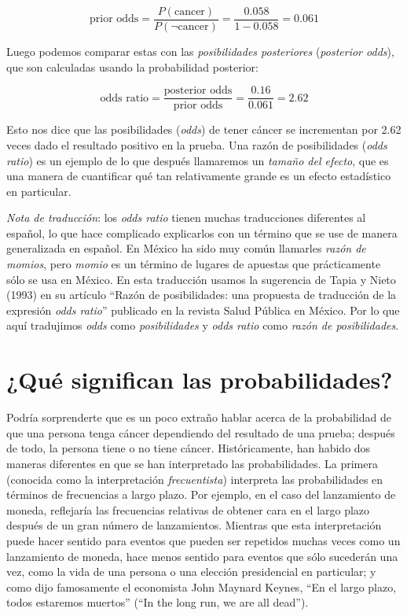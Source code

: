 \documentclass[
  12pt,
]{book}
\begin{document}
\[
\text{prior odds} = \frac{P(\text{cancer})}{P(\neg \text{cancer})} =\frac{0.058}{1 - 0.058} = 0.061
\]

Luego podemos comparar estas con las \emph{posibilidades posteriores} (\emph{posterior odds}), que son calculadas usando la probabilidad posterior:

\[
\text{odds ratio} = \frac{\text{posterior odds}}{\text{prior odds}} = \frac{0.16}{0.061} = 2.62
\]

Esto nos dice que las posibilidades (\emph{odds}) de tener cáncer se incrementan por 2.62 veces dado el resultado positivo en la prueba. Una razón de posibilidades (\emph{odds ratio}) es un ejemplo de lo que después llamaremos un \emph{tamaño del efecto}, que es una manera de cuantificar qué tan relativamente grande es un efecto estadístico en particular.

\emph{Nota de traducción}: los \emph{odds ratio} tienen muchas traducciones diferentes al español, lo que hace complicado explicarlos con un término que se use de manera generalizada en español. En México ha sido muy común llamarles \emph{razón de momios}, pero \emph{momio} es un término de lugares de apuestas que prácticamente sólo se usa en México. En esta traducción usamos la sugerencia de Tapia y Nieto (1993) en su artículo ``Razón de posibilidades: una propuesta de traducción de la expresión \emph{odds ratio}'' publicado en la revista Salud Pública en México. Por lo que aquí tradujimos \emph{odds} como \emph{posibilidades} y \emph{odds ratio} como \emph{razón de posibilidades}.

\hypertarget{quuxe9-significan-las-probabilidades}{%
\section{¿Qué significan las probabilidades?}\label{quuxe9-significan-las-probabilidades}}

Podría sorprenderte que es un poco extraño hablar acerca de la probabilidad de que una persona tenga cáncer dependiendo del resultado de una prueba; después de todo, la persona tiene o no tiene cáncer. Históricamente, han habido dos maneras diferentes en que se han interpretado las probabilidades. La primera (conocida como la interpretación \emph{frecuentista}) interpreta las probabilidades en términos de frecuencias a largo plazo. Por ejemplo, en el caso del lanzamiento de moneda, reflejaría las frecuencias relativas de obtener cara en el largo plazo después de un gran número de lanzamientos. Mientras que esta interpretación puede hacer sentido para eventos que pueden ser repetidos muchas veces como un lanzamiento de moneda, hace menos sentido para eventos que sólo sucederán una vez, como la vida de una persona o una elección presidencial en particular; y como dijo famosamente el economista John Maynard Keynes, ``En el largo plazo, todos estaremos muertos'' (``In the long run, we are all dead'').
\end{document}
